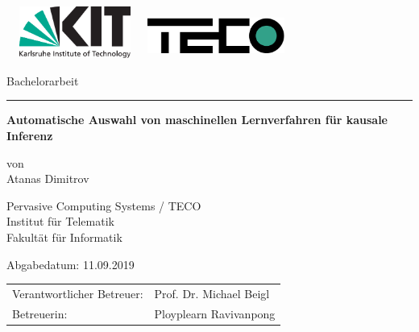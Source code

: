 \documentclass[12pt,a4paper,twoside]{scrartcl}
\numberwithin{equation}{section}
\begin{document}
\boldmath
\nonfrenchspacing

\pagestyle{empty}


\setlength{\parindent}{4em}
\setlength{\parskip}{1em}

\begin{titlepage}

  \begin{center}\large

    {\flushleft\includegraphics[height=17mm, width=45mm]{kit_logo_en.pdf} \hfill}
    \includegraphics[height=15mm, width=45mm]{group_logo.pdf}\quad\null

    \vspace*{1cm}
    {\Large Bachelorarbeit}\\
    \noindent\hfil\rule{0.4\textwidth}{.4pt}\hfil
    \vspace*{1cm}

    {\bf\huge Automatische Auswahl von maschinellen Lernverfahren für kausale Inferenz\par}
    \vspace*{5mm}

    von\\
    \vspace*{3mm}
    {\huge{Atanas Dimitrov}}

    \vspace*{10mm}
    Pervasive Computing Systems / TECO\\
    Institut für Telematik\\
	Fakultät für Informatik\\
   
    \vspace*{15mm}

   	Abgabedatum: 11.09.2019
    \vspace*{10mm}


    \begin{tabular}{p{8cm}l}
     Verantwortlicher Betreuer: &Prof. Dr. Michael Beigl\\
     Betreuerin: &Ployplearn Ravivanpong\\  
    \end{tabular}

    \vspace*{8mm}

  \end{center}

\end{titlepage}
\end{document}

